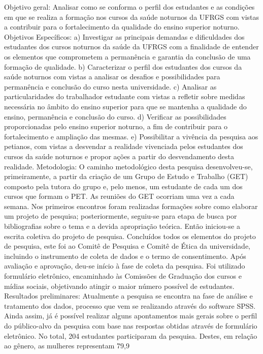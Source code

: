 Objetivo geral:
Analisar como se conforma o perfil dos estudantes e as condições em que se realiza a formação nos cursos
da saúde noturnos da UFRGS com vistas a contribuir para o fortalecimento da qualidade do ensino superior noturno.
Objetivos Específicos:
a) Investigar as principais demandas e dificuldades dos estudantes dos cursos noturnos da saúde da
UFRGS com a finalidade de entender os elementos que comprometem a permanência e garantia da
conclusão de uma formação de qualidade.
b) Caracterizar o perfil dos estudantes dos cursos da saúde noturnos com vistas a analisar os desafios e
possibilidades para permanência e conclusão do curso nesta universidade.
c) Analisar as particularidades do trabalhador estudante com vistas a refletir sobre medidas necessária no
âmbito do ensino superior para que se mantenha a qualidade do ensino, permanência e conclusão do
curso.
d) Verificar as possibilidades proporcionadas pelo ensino superior noturno, a fim de contribuir para o
fortalecimento e ampliação das mesmas.
e) Possibilitar a vivência da pesquisa aos petianos, com vistas a desvendar a realidade vivenciada pelos
estudantes dos cursos da saúde noturnos e propor ações a partir do desvendamento desta realidade.
Metodologia:
O caminho metodológico desta pesquisa desenvolveu-se, primeiramente, a partir da criação de um Grupo
de Estudo e Trabalho (GET) composto pela tutora do grupo e, pelo menos, um estudante de cada um dos cursos que
formam o PET. As reuniões do GET ocorriam uma vez a cada semana. Nos primeiros encontros foram realizadas
formações sobre como elaborar um projeto de pesquisa; posteriormente, seguiu-se para etapa de busca por
bibliografias sobre o tema e a devida apropriação teórica. Então iniciou-se a escrita coletiva do projeto de pesquisa.
Concluídos todos os elementos do projeto de pesquisa, este foi ao Comitê de Pesquisa e Comitê de Ética da
universidade, incluindo o instrumento de coleta de dados e o termo de consentimento. Após avaliação e aprovação,
deu-se início à fase de coleta da pesquisa. Foi utilizado formulário eletrônico, encaminhado às Comissões de
Graduação dos cursos e mídias sociais, objetivando atingir o maior número possível de estudantes.
Resultados preliminares:
Atualmente a pesquisa se encontra na fase de análise e tratamento dos dados, processo que vem se
realizando através do software SPSS. Ainda assim, já é possível realizar alguns apontamentos mais gerais sobre o
perfil do público-alvo da pesquisa com base nas respostas obtidas através de formulário eletrônico. No total, 204
estudantes participaram da pesquisa. Destes, em relação ao gênero, as mulheres representam 79,9%
